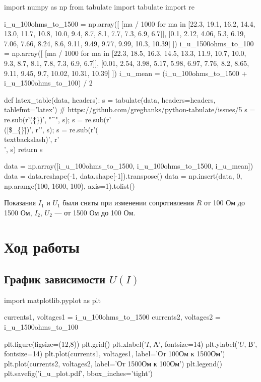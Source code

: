 \documentclass[12pt, a4paper]{article}
\begin{document}
\begin{pycode}
import numpy as np
from tabulate import tabulate
import re

i_u_100ohms_to_1500 = np.array([
  [ma / 1000 for ma in [22.3, 19.1, 16.2, 14.4, 13.0, 11.7, 10.8, 10.0, 9.4, 8.7, 8.1, 7.7, 7.3, 6.9, 6.7]],
  [0.1, 2.12, 4.06, 5.3, 6.19, 7.06, 7.66, 8.24, 8.6, 9.11, 9.49, 9.77, 9.99, 10.3, 10.39]
])
i_u_1500ohms_to_100 = np.array([
  [ma / 1000 for ma in [22.3, 18.5, 16.3, 14.5, 13.3, 11.9, 10.7, 10.0, 9.3, 8.7, 8.1, 7.8, 7.3, 6.9, 6.7]],
  [0.01, 2.54, 3.98, 5.17, 5.98, 6.97, 7.76, 8.2, 8.65, 9.11, 9.45, 9.7, 10.02, 10.31, 10.39]
])
i_u_mean = (i_u_100ohms_to_1500 + i_u_1500ohms_to_100) / 2

def latex_table(data, headers):
  s = tabulate(data, headers=headers, tablefmt='latex')
  # https://github.com/gregbanks/python-tabulate/issues/5
  s = re.sub(r'(\^\{\})', "^", s); s = re.sub(r'\\([\$\_\{\}\^])', r'\1', s); s = re.sub(r'(\\textbackslash{})', r'\\', s)
  return s

data = np.array([i_u_100ohms_to_1500, i_u_100ohms_to_1500, i_u_mean])
data = data.reshape(-1, data.shape[-1]).transpose()
data = np.insert(data, 0, np.arange(100, 1600, 100), axis=1).tolist()
\end{pycode}

\begin{table}[H]
\end{table} 

Показания $I_1$ и $U_1$ были сняты при изменении сопротивления $R$ от 100 Ом
до 1500 Ом, $I_2$, $U_2$ — от 1500 Ом до 100 Ом.

\section*{Ход работы}

\subsection*{График зависимости $U(I)$}

\begin{pycode}
import matplotlib.pyplot as plt

currents1, voltages1 = i_u_100ohms_to_1500
currents2, voltages2 = i_u_1500ohms_to_100

plt.figure(figsize=(12,8))
plt.grid()
plt.xlabel('$I$, А', fontsize=14)
plt.ylabel('$U$, В', fontsize=14)
plt.plot(currents1, voltages1, label='От 100Ом к 1500Ом')
plt.plot(currents2, voltages2, label='От 1500Ом к 100Ом')
plt.legend()
plt.savefig('i_u_plot.pdf', bbox_inches='tight')
\end{pycode}
\end{document}
